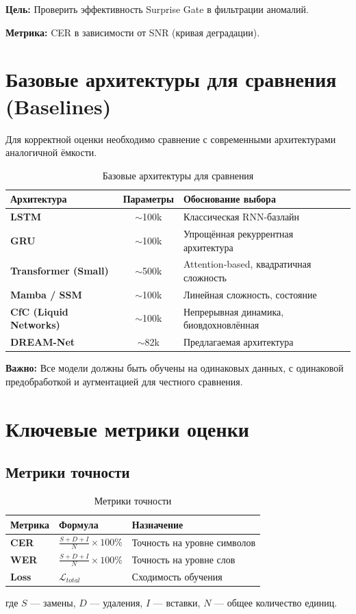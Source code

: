 \textbf{Цель:} Проверить эффективность Surprise Gate в фильтрации аномалий.

\textbf{Метрика:} CER в зависимости от SNR (кривая деградации).

\section{Базовые архитектуры для сравнения (Baselines)}

Для корректной оценки необходимо сравнение с современными архитектурами аналогичной ёмкости.

\begin{table}[h]
\centering
\caption{Базовые архитектуры для сравнения}
\label{tab:baselines}
\begin{tabular}{lcp{6cm}}
\toprule
\textbf{Архитектура} & \textbf{Параметры} & \textbf{Обоснование выбора} \\
\midrule
\textbf{LSTM} & $\sim$100k & Классическая RNN-базлайн \\
\textbf{GRU} & $\sim$100k & Упрощённая рекуррентная архитектура \\
\textbf{Transformer (Small)} & $\sim$500k & Attention-based, квадратичная сложность \\
\textbf{Mamba / SSM} & $\sim$100k & Линейная сложность, состояние \\
\textbf{CfC (Liquid Networks)} & $\sim$100k & Непрерывная динамика, биовдохновлённая \\
\textbf{DREAM-Net} & $\sim$82k & Предлагаемая архитектура \\
\bottomrule
\end{tabular}
\end{table}

\textbf{Важно:} Все модели должны быть обучены на одинаковых данных, с одинаковой предобработкой и аугментацией для честного сравнения.

\section{Ключевые метрики оценки}

\subsection{Метрики точности}

\begin{table}[h]
\centering
\caption{Метрики точности}
\label{tab:accuracy_metrics}
\begin{tabular}{lp{6cm}p{4cm}}
\toprule
\textbf{Метрика} & \textbf{Формула} & \textbf{Назначение} \\
\midrule
\textbf{CER} & $\frac{S + D + I}{N} \times 100\%$ & Точность на уровне символов \\
\textbf{WER} & $\frac{S + D + I}{N} \times 100\%$ & Точность на уровне слов \\
\textbf{Loss} & $\mathcal{L}_{total}$ & Сходимость обучения \\
\bottomrule
\end{tabular}
\end{table}
где $S$ — замены, $D$ — удаления, $I$ — вставки, $N$ — общее количество единиц.

